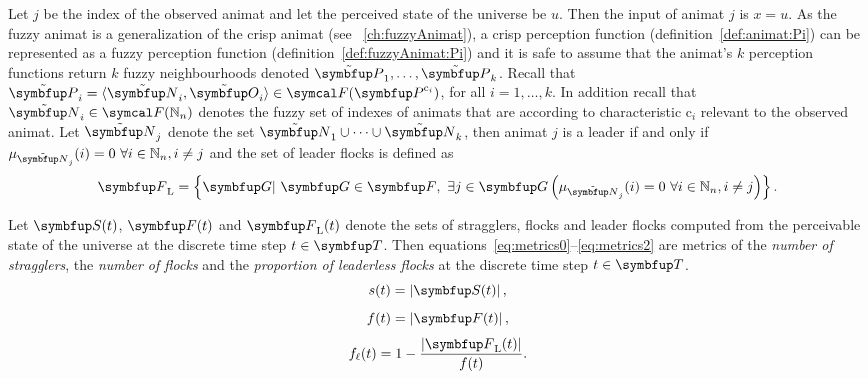 Let $j$ be the index of the observed animat and let the perceived state of the universe be $u$. Then the input of animat $j$ is $x=u$.
As the fuzzy animat is a generalization of the crisp animat (see \chaptername~\ref{ch:fuzzyAnimat}), a crisp perception function (definition~\ref{def:animat:Pi}) can be represented as a fuzzy perception function (definition~\ref{def:fuzzyAnimat:Pi}) and it is safe to assume that the animat's $k$ perception functions return $k$ fuzzy neighbourhoods denoted $\fset{P}_1,\ldots,\fset{P}_k$. Recall that $\fset{P}_i=\langle\fset{N}_i,\fset{O}_i\rangle \in \fpowset{\set{P}^{\mathrm{c}_i}}$, for all $i=1,\ldots,k$. In addition recall that $\fset{N}_i \in \fpowset{\N_n}$ denotes the fuzzy set of indexes of animats that are according to characteristic $\mathrm{c}_i$ relevant to the observed animat. Let $\fset{N}_j$ denote the set $\fset{N}_1 \cup \cdots \cup \fset{N}_k$, then animat $j$ is a leader if and only if $\mu_{\fset{N}_j}(i)=0\ \forall i \in \N_n, i \neq j$ and the set of leader flocks is defined as 
%
\begin{equation}
	\set{F}_\textnormal{L}=\left\{ \set{G}|\ \set{G} \in \set{F},\ \exists j \in \set{G}\left(\mu_{\fset{N}_j}(i)=0\ \forall i \in \N_n, i \neq j\right) \right\}. \label{eq:metric:FL}
\end{equation}

\begin{definition}
	\label{def:metrics}
	Let $\set{S}(t)$, $\set{F}(t)$ and $\set{F}_\textnormal{L}(t)$ denote the sets of stragglers, flocks and leader flocks computed from the perceivable state of the universe at the discrete time step $t \in \set{T}$. Then equations~\eqref{eq:metrics0}--\eqref{eq:metrics2} are metrics of the \emph{number of stragglers}, the \emph{number of flocks} and the \emph{proportion of leaderless flocks} at the discrete time step $t \in \set{T}$.
	\begin{equation}
		s(t)=\left|\set{S}(t)\right|, \label{eq:metrics0}
	\end{equation}
	\vspace*{-6mm}
	\begin{equation}
		f(t)=\left|\set{F}(t)\right|,
	\end{equation}
	\vspace*{-2mm}
	\begin{equation}
		f_\ell(t)=1-\frac{\left|\set{F}_\textnormal{L}(t)\right|}{f(t)}. \label{eq:metrics2}
	\end{equation}
\end{definition}

